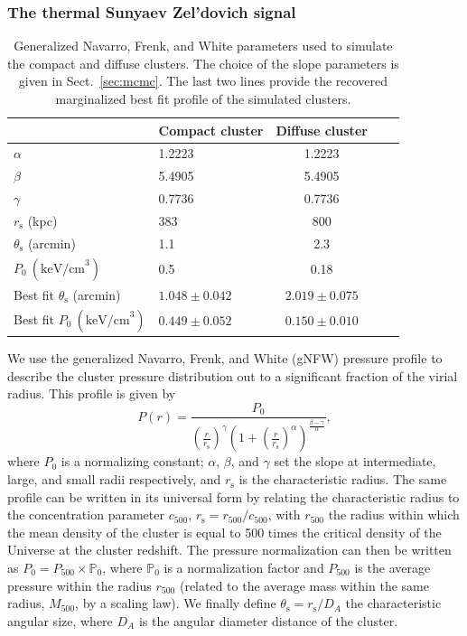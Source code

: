 \subsubsection{The thermal Sunyaev Zel'dovich signal}
 \label{sec:sz_simu}
       	\begin{table}
	\begin{center}
	\begin{tabular}{llccc}
	\hline
	\hline
	 & Compact cluster & Diffuse cluster \\
	\hline
	$\alpha$ & 1.2223 & 1.2223 \\
	$\beta$ & 5.4905 & 5.4905 \\
	$\gamma$ & 0.7736 & 0.7736 \\
	$r_{\mathrm{s}}$ (kpc) & 383 & 800 \\
	$\theta_{\mathrm{s}}$ (arcmin) & 1.1 & 2.3 \\
	$P_0 \ (\mathrm{keV/cm}^3)$ & 0.5 & 0.18 \\
	Best fit $\theta_{\mathrm{s}}$ (arcmin) & $1.048 \pm 0.042$ & $2.019 \pm 0.075$ \\   
	Best fit $P_0 \ (\mathrm{keV/cm}^3)$ & $0.449 \pm 0.052$ & $0.150 \pm 0.010$ \\  
	\hline
	\end{tabular}
	\end{center}
	\caption{Generalized Navarro, Frenk, and White parameters used to simulate the compact and diffuse clusters. The choice of the slope parameters is given in Sect.~\ref{sec:mcmc}. The last two lines provide the recovered marginalized best fit profile of the simulated clusters.}
	\label{tab:table_simu}
	\end{table}	
We use the generalized Navarro, Frenk, and White (gNFW) pressure profile \citep{gNFW} to describe the cluster pressure distribution out to a significant fraction of the virial radius. This profile is given by
\begin{equation}
	P(r) = \frac{P_0}{\left(\frac{r}{r_{\mathrm{s}}}\right)^{\gamma}\left(1+\left(\frac{r}{r_{\mathrm{s}}}\right)^{\alpha}\right)^{\frac{\beta-\gamma}{\alpha}}},
	\label{eq:gNFW}
   \end{equation}
where $P_0$ is a normalizing constant; $\alpha$, $\beta$, and $\gamma$ set the slope at intermediate, large, and small radii respectively, and $r_{\mathrm{s}}$ is the characteristic radius. The same profile can be written in its universal form \citep{arnaud_2010} by relating the characteristic radius to the concentration parameter $c_{500}$, $r_{\mathrm{s}} = r_{500}/c_{500}$, with $r_{500}$ the radius within which the mean density of the cluster is equal to 500 times the critical density of the Universe at the cluster redshift. The pressure normalization can then be written as $P_0 = P_{500} \times \mathds{P}_0$, where $\mathds{P}_0$ is a normalization factor and $P_{500}$ is the average pressure within the radius $r_{500}$ (related to the average mass within the same radius, $M_{500}$, by a scaling law). We finally define $\theta_{\mathrm{s}} = r_{\mathrm{s}}/D_A$ the characteristic angular size, where $D_A$ is the angular diameter distance of the cluster.

